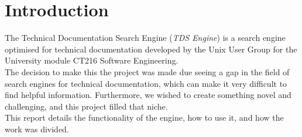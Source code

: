 \section{Introduction}
The Technical Documentation Search Engine (\textit{TDS Engine}) is a search engine optimised for technical documentation developed by the Unix User Group for the University module CT216 Software Engineering. \\
The decision to make this the project was made due seeing a gap in the field of search engines for technical documentation, which can make it very difficult to find helpful information. Furthermore, we wished to create something novel and challenging, and this project filled that niche. \\

This report details the functionality of the engine, how to use it, and how the work was divided. 
